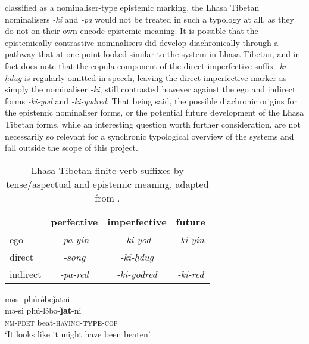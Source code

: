 classified as a nominaliser-type epistemic marking, the Lhasa Tibetan nominalisers \textit{-ki} and \textit{-pa} would not be treated in such a typology at all, as they do not on their own encode epistemic meaning. It is possible that the epistemically contrastive nominalisers did develop diachronically through a pathway that at one point looked similar to the system in Lhasa Tibetan, and in fact  does note that the copula component of the direct imperfective suffix \textit{-ki-ḥdug} is regularly omitted in speech, leaving the direct imperfective marker as simply the nominaliser \textit{-ki}, still contrasted however against the ego and indirect forms \textit{-ki-yod} and \textit{-ki-yodred}. That being said, the possible diachronic origins for the epistemic nominaliser forms, or the potential future development of the Lhasa Tibetan forms, while an interesting question worth further consideration, are not necessarily so relevant for a synchronic typological overview of the systems and fall outside the scope of this project. 

\begin{table}
        \begin{tabular}{l|c|c|c}
         & perfective       & imperfective         & future           \\ \hline
        ego                  & \textit{-pa-yin} & \textit{-ki-yod}     & \textit{-ki-yin} \\
        direct               & \textit{-song}   & \textit{-ki-ḥdug}    & \textit{}        \\
        indirect             & \textit{-pa-red} & \textit{-ki-yodred} & \textit{-ki-red}
        \end{tabular}
        \caption{Lhasa Tibetan finite verb suffixes by tense/aspectual and epistemic meaning, adapted from .}\label{t:Description:LhasaTibetanFinite}
\end{table}

\begin{exe}
        \ex\label{e:Description:MeitheiNominaliser}
        \glll məsi phúrə́beǰatni \\
        mə-si phú-lə́bə-\textbf{ǰat}-ni \\
        \textsc{nm-pdet} beat-\textsc{having-\textbf{type}-cop} \\
        \glt `It looks like it might have been beaten' \\
        \cite[Meithei,][296]{Chelliah1997}
\end{exe}

